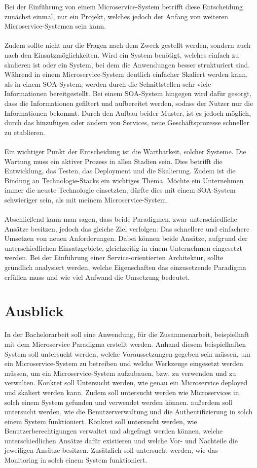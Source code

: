 Bei der Einführung von einem Microservice-System betrifft diese Entscheidung zunächst einmal, nur ein Projekt, welches jedoch der Anfang von weiteren Microservice-Systemen sein kann.
\\\\
Zudem sollte nicht nur die Fragen nach dem Zweck gestellt werden, sondern auch nach den Einsatzmöglichkeiten. Wird ein System benötigt, welches einfach zu skalieren ist oder ein System, bei dem die Anwendungen besser strukturiert sind. Während in einem Microservice-System deutlich einfacher Skaliert werden kann, als in einem SOA-System, werden durch die Schnittstellen sehr viele Informationen bereitgestellt. Bei einem SOA-System hingegen wird dafür gesorgt, dass die Informationen gefiltert und aufbereitet werden, sodass der Nutzer nur die Informationen bekommt. Durch den Aufbau beider Muster, ist es jedoch möglich, durch das hinzufügen oder ändern von Services, neue Geschäftsprozesse schneller zu etablieren.
\\\\
Ein wichtiger Punkt der Entscheidung ist die Wartbarkeit, solcher Systeme. Die Wartung muss ein aktiver Prozess in allen Stadien sein. Dies betrifft die Entwicklung, das Testen, das Deployment und die Skalierung. Zudem ist die Bindung an Technologie-Stacks ein wichtiges Thema. Möchte ein Unternehmen immer die neuste Technologie einsetzten, dürfte dies mit einem SOA-System schwieriger sein, als mit meinem Microservice-System.
\\\\
Abschließend kann man sagen, dass beide Paradigmen, zwar unterschiedliche Ansätze besitzen, jedoch das gleiche Ziel verfolgen: Das schnellere und einfachere Umsetzen von neuen Anforderungen. Dabei können beide Ansätze, aufgrund der unterschiedlichen Einsatzgebiete, gleichzeitig in einem Unternehmen eingesetzt werden. Bei der Einführung einer Service-orientierten Architektur, sollte gründlich analysiert werden, welche Eigenschaften das einzusetzende Paradigma erfüllen muss und wie viel Aufwand die Umsetzung bedeutet.

\section{Ausblick}
\label{sec:Ausblick}
In der Bachelorarbeit soll eine Anwendung, für die Zusammenarbeit, beispielhaft mit dem Microservice Paradigma erstellt werden. Anhand diesem beispielhaften System soll untersucht werden, welche Voraussetzungen gegeben sein müssen, um ein Microservice-System zu betreiben und welche Werkzeuge eingesetzt werden müssen, um ein Microservice-System aufzubauen, bzw. zu verwenden und zu verwalten. Konkret soll Untersucht werden, wie genau ein Microservice deployed und skaliert werden kann. Zudem soll untersucht werden wie Microservices in solch einem System gefunden und verwendet werden können. außerdem soll untersucht werden, wie die Benutzerverwaltung und die Authentifizierung in solch einem System funktioniert. Konkret soll untersucht werden, wie Benutzerberechtigungen verwaltet und abgefragt werden können, welche unterschiedlichen Ansätze dafür existieren und welche Vor- und Nachteile die jeweiligen Ansätze besitzen. Zusätzlich soll untersucht werden, wie das Monitoring in solch einem System funktioniert.